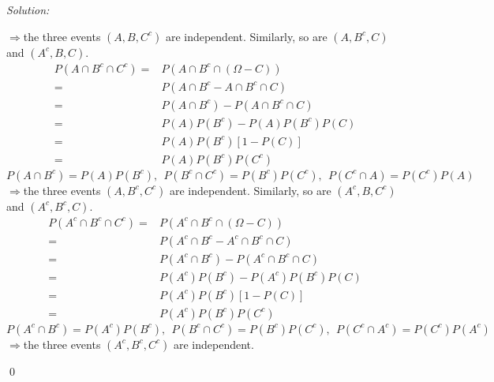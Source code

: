 \documentclass[12pt]{article}
\newenvironment{sol}
    {\emph{Solution:}
    }
    {
    \qed
    }
\begin{document}
\begin{sol}
\[\]
$\Longrightarrow$the three events $(A,B,C^c)$ are independent. Similarly, so are $(A,B^c,C)$ and $(A^c,B,C)$.
\begin{align*}
P(A\cap B^c\cap C^c)=&P(A\cap B^c\cap(\Omega-C))\\
=&P(A\cap B^c-A\cap B^c\cap C)\\
=&P(A\cap B^c)-P(A\cap B^c\cap C)\\
=&P(A)P(B^c)-P(A)P(B^c)P(C)\\
=&P(A)P(B^c)[1-P(C)]\\
=&P(A)P(B^c)P(C^c)
\end{align*}
\[
P(A\cap B^c)=P(A)P(B^c),~~P(B^c\cap C^c)=P(B^c)P(C^c),~~P(C^c\cap A)=P(C^c)P(A)
\]
$\Longrightarrow$the three events $(A,B^c,C^c)$ are independent. Similarly, so are $(A^c,B,C^c)$ and $(A^c,B^c,C)$.
\begin{align*}
P(A^c\cap B^c\cap C^c)=&P(A^c\cap B^c\cap(\Omega-C))\\
=&P(A^c\cap B^c-A^c\cap B^c\cap C)\\
=&P(A^c\cap B^c)-P(A^c\cap B^c\cap C)\\
=&P(A^c)P(B^c)-P(A^c)P(B^c)P(C)\\
=&P(A^c)P(B^c)[1-P(C)]\\
=&P(A^c)P(B^c)P(C^c)
\end{align*}
\[
P(A^c\cap B^c)=P(A^c)P(B^c),~~P(B^c\cap C^c)=P(B^c)P(C^c),~~P(C^c\cap A^c)=P(C^c)P(A^c)
\]
$\Longrightarrow$the three events $(A^c,B^c,C^c)$ are independent.
\end{sol}
\end{document}
